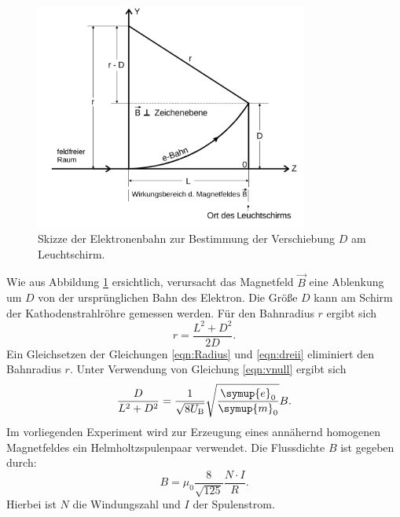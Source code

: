 \begin{figure}
  \centering
  \includegraphics[width=0.8\textwidth]{Messdaten/ablenkungbfeld.png}
  \caption{Skizze der Elektronenbahn zur Bestimmung der Verschiebung $D$ am Leuchtschirm.}
  \label{fig:D}
\end{figure}
Wie aus Abbildung \ref{fig:D} ersichtlich, verursacht das Magnetfeld $\vec{B}$ eine Ablenkung um $D$ von der ursprünglichen Bahn des Elektron.
Die Größe $D$ kann am Schirm der Kathodenstrahlröhre gemessen werden.
Für den Bahnradius $r$ ergibt sich
\begin{equation}
  \label{eqn:dreii}
	r=\frac{L^2+D^2}{2D} \mathrm{.}
\end{equation}
Ein Gleichsetzen der Gleichungen \eqref{eqn:Radius} und \eqref{eqn:dreii} eliminiert den Bahnradius $r$. Unter Verwendung von Gleichung \eqref{eqn:vnull} ergibt sich
\begin{equation}
  \label{eqn:bfeld1}
  \frac{D}{L^2+D^2}=\frac{1}{\sqrt{8U_\mathrm{B}}}\sqrt{\frac{\symup{e}_0}{\symup{m}_0}}B \text{.}
\end{equation}
Im vorliegenden Experiment wird zur Erzeugung eines annähernd homogenen Magnetfeldes ein Helmholtzspulenpaar verwendet.
Die Flussdichte $B$ ist gegeben durch:
\begin{equation}
  \label{eqn:b-feld}
  B=\mu_0\frac{8}{\sqrt{125}}\frac{N\cdot I}{R} \text{.}
\end{equation}
Hierbei ist $N$ die Windungszahl und $I$ der Spulenstrom.
